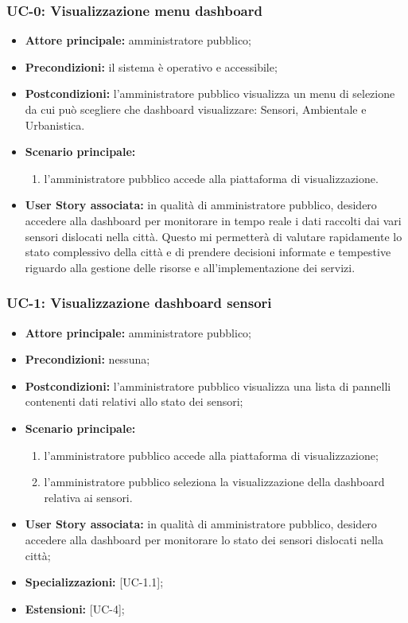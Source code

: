 \documentclass[8pt]{article}
\begin{document}
\subsubsection*{UC-0: Visualizzazione menu dashboard}
\begin{itemize}
    \item \textbf{Attore principale:} amministratore pubblico;
    \item \textbf{Precondizioni:} il sistema è operativo e accessibile;
    \item \textbf{Postcondizioni:} l'amministratore pubblico visualizza un menu di selezione da cui
        può scegliere che dashboard visualizzare: Sensori, Ambientale e Urbanistica.
    \item \textbf{Scenario principale:} 
        \begin{enumerate}
        \item l'amministratore pubblico accede alla piattaforma di visualizzazione.
        \end{enumerate}
    \item \textbf{User Story associata: }in qualità di amministratore pubblico, desidero accedere alla dashboard per monitorare in tempo reale i dati raccolti dai vari sensori dislocati nella città. Questo mi permetterà di valutare rapidamente lo stato complessivo della città e di prendere decisioni informate e tempestive riguardo alla gestione delle risorse e all’implementazione dei servizi.
\end{itemize}

\subsubsection*{UC-1: Visualizzazione dashboard sensori}
\begin{itemize}
    \item \textbf{Attore principale:} amministratore pubblico;
    \item \textbf{Precondizioni:} nessuna;
    \item \textbf{Postcondizioni:} l'amministratore pubblico visualizza una lista di pannelli
        contenenti dati relativi allo stato dei sensori;
    \item \textbf{Scenario principale:}
    \begin{enumerate}
    \item l’amministratore pubblico accede alla piattaforma di visualizzazione;
    \item l’amministratore pubblico seleziona la visualizzazione della dashboard relativa ai sensori.
    \end{enumerate}
    \item \textbf{User Story associata:} in qualità di amministratore pubblico, desidero accedere
        alla dashboard per monitorare lo stato dei sensori dislocati nella città;
    \item \textbf{Specializzazioni:} [UC-1.1];
    \item \textbf{Estensioni:} [UC-4];
\end{itemize}
\end{document}

